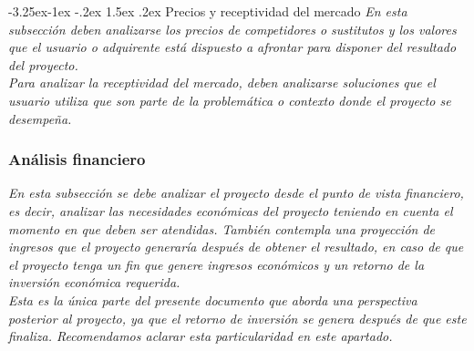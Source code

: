 \documentclass[12pt]{article}
\makeatletter
\renewcommand\paragraph{\@startsection{paragraph}{4}{\z@}%
                                     {-3.25ex\@plus -1ex \@minus -.2ex}%
                                     {1.5ex \@plus .2ex}%
                                     {\normalfont\normalsize\bfseries}}
\makeatother
\begin{document}
    \paragraph{Precios y receptividad del mercado}
    {\it
    En esta subsección deben analizarse los precios de competidores o sustitutos y los valores que el usuario o adquirente está dispuesto a afrontar para disponer del resultado del proyecto.\\
    Para analizar la receptividad del mercado, deben analizarse soluciones que el usuario utiliza que son parte de la problemática o contexto donde el proyecto se desempeña.
   }


\subsubsection{Análisis financiero}
{\it
En esta subsección se debe analizar el proyecto desde el punto de vista financiero, es decir, analizar las necesidades económicas del proyecto teniendo en cuenta el momento en que deben ser atendidas. También contempla una proyección de ingresos que el proyecto generaría después de obtener el resultado, en caso de que el proyecto tenga un fin que genere ingresos económicos y un retorno de la inversión económica requerida.\\
Esta es la única parte del presente documento que aborda una perspectiva posterior al proyecto, ya que el retorno de inversión se genera después de que este finaliza. Recomendamos aclarar esta particularidad en este apartado.
}
\end{document}
